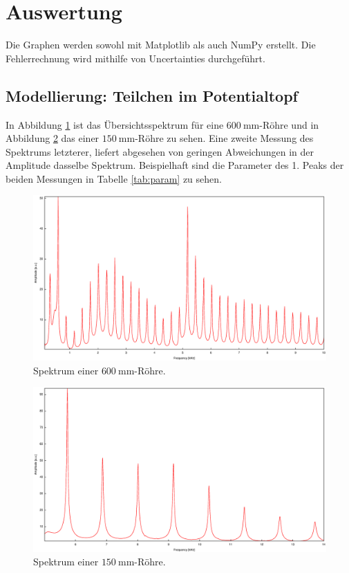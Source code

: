 \section{Auswertung}
\label{sec:Auswertung}

Die Graphen werden sowohl mit Matplotlib \cite{matplotlib} als auch NumPy \cite{numpy} erstellt. Die Fehlerrechnung wird mithilfe von Uncertainties \cite{uncertainties} durchgeführt.

\subsection{Modellierung: Teilchen im Potentialtopf}

In Abbildung \ref{fig:Uebersicht} ist das Übersichtsspektrum für eine $\SI{600}{\milli\meter}$-Röhre und in Abbildung \ref{fig:150} das einer $\SI{150}{\milli\meter}$-Röhre zu sehen.
Eine zweite Messung des Spektrums letzterer, liefert abgesehen von geringen Abweichungen in der Amplitude dasselbe Spektrum.
Beispielhaft sind die Parameter des 1. Peaks der beiden Messungen in Tabelle \ref{tab:param} zu sehen.

\begin{figure}
\centering
\includegraphics[width=\linewidth-70pt,height=\textheight-70pt,keepaspectratio]{FP-V23data/1.1_600mm.eps}
\caption{Spektrum einer $\SI{600}{\milli\meter}$-Röhre.}
\label{fig:Uebersicht}
\end{figure}

\begin{figure}
\centering
\includegraphics[width=\linewidth-70pt,height=\textheight-70pt,keepaspectratio]{FP-V23data/1.2(4.1)_150mm.eps}
\caption{Spektrum einer $\SI{150}{\milli\meter}$-Röhre.}
\label{fig:150}
\end{figure}

